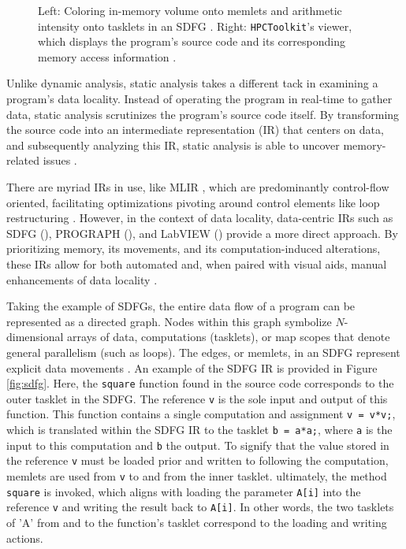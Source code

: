 \begin{figure}
\begin{subfigure}[c]{.68\textwidth}
	\end{subfigure}
	\caption{Left: Coloring in-memory volume onto memlets and arithmetic intensity onto tasklets in an SDFG \cite{schaad2021boosting}. Right: \texttt{HPCToolkit}'s viewer, which displays the program's source code and its corresponding memory access information \cite{adhianto2010hpctoolkit}.}
	\label{fig:coarse}
\end{figure}

Unlike dynamic analysis, static analysis takes a different tack in examining a program's data locality. Instead of operating the program in real-time to gather data, static analysis scrutinizes the program's source code itself. By transforming the source code into an intermediate representation (IR) that centers on data, and subsequently analyzing this IR, static analysis is able to uncover memory-related issues \cite{schaad2022boosting,schaad2021boosting,calotoiu2022lifting,ben2023bridging}.

There are myriad IRs in use, like MLIR \cite{lattner2020mlir}, which are predominantly control-flow oriented, facilitating optimizations pivoting around control elements like loop restructuring \cite{moses2021polygeist}. However, in the context of data locality, data-centric IRs such as SDFG (\cite{ben2019statefulSDFG}), PROGRAPH (\cite{matwin1985prograph}), and LabVIEW (\cite{kodosky2020labview}) provide a more direct approach. By prioritizing memory, its movements, and its computation-induced alterations, these IRs allow for both automated \cite{ben2019statefulSDFG} and, when paired with visual aids, manual enhancements of data locality \cite{ben2023bridging,ben2019statefulSDFG,schaad2021boosting}.

Taking the example of SDFGs, the entire data flow of a program can be represented as a directed graph. Nodes within this graph symbolize $N$-dimensional arrays of data, computations (tasklets), or map scopes that denote general parallelism (such as loops). The edges, or memlets, in an SDFG represent explicit data movements \cite{ben2019statefulSDFG}. An example of the SDFG IR is provided in Figure \ref{fig:sdfg}. Here, the \texttt{square} function found in the source code corresponds to the outer tasklet in the SDFG. The reference \texttt{v} is the sole input and output of this function. This function contains a single computation and assignment \texttt{v = v*v;}, which is translated within the SDFG IR to the tasklet \texttt{b = a*a;}, where \texttt{a} is the input to this computation and \texttt{b} the output. To signify that the value stored in the reference \texttt{v} must be loaded prior and written to following the computation, memlets are used from \texttt{v} to and from the inner tasklet. ultimately, the method \texttt{square} is invoked, which aligns with loading the parameter \texttt{A[i]} into the reference \texttt{v} and writing the result back to \texttt{A[i]}. In other words, the two tasklets of 'A' from and to the function's tasklet correspond to the loading and writing actions.

